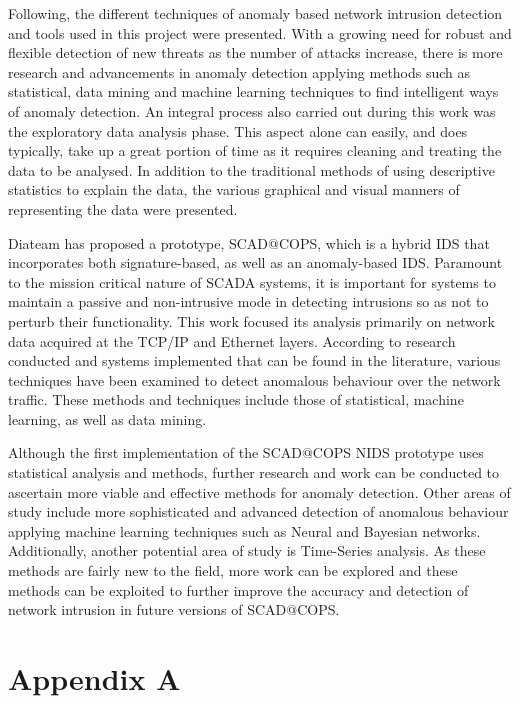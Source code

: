 \documentclass[12pt,]{article}
\begin{document}
Following, the different techniques of anomaly based network intrusion
detection and tools used in this project were presented. With a growing
need for robust and flexible detection of new threats as the number of
attacks increase, there is more research and advancements in anomaly
detection applying methods such as statistical, data mining and machine
learning techniques to find intelligent ways of anomaly detection. An
integral process also carried out during this work was the exploratory
data analysis phase. This aspect alone can easily, and does typically,
take up a great portion of time as it requires cleaning and treating the
data to be analysed. In addition to the traditional methods of using
descriptive statistics to explain the data, the various graphical and
visual manners of representing the data were presented.

Diateam has proposed a prototype, SCAD@COPS, which is a hybrid IDS that
incorporates both signature-based, as well as an anomaly-based IDS.
Paramount to the mission critical nature of SCADA systems, it is
important for systems to maintain a passive and non-intrusive mode in
detecting intrusions so as not to perturb their functionality. This work
focused its analysis primarily on network data acquired at the TCP/IP
and Ethernet layers. According to research conducted and systems
implemented that can be found in the literature, various techniques have
been examined to detect anomalous behaviour over the network traffic.
These methods and techniques include those of statistical, machine
learning, as well as data mining.

Although the first implementation of the SCAD@COPS NIDS prototype uses
statistical analysis and methods, further research and work can be
conducted to ascertain more viable and effective methods for anomaly
detection. Other areas of study include more sophisticated and advanced
detection of anomalous behaviour applying machine learning techniques
such as Neural and Bayesian networks. Additionally, another potential
area of study is Time-Series analysis. As these methods are fairly new
to the field, more work can be explored and these methods can be
exploited to further improve the accuracy and detection of network
intrusion in future versions of SCAD@COPS.

\pagebreak

\section*{Appendix A}\label{appendix-a}
\end{document}
